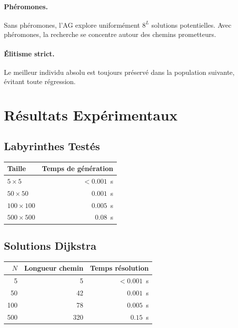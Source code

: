\documentclass[12pt, a4paper]{article}
\theoremstyle{definition}
\theoremstyle{remark}
\begin{document}
\paragraph{Phéromones.}
Sans phéromones, l'AG explore uniformément $8^L$ solutions potentielles.
Avec phéromones, la recherche se concentre autour des chemins prometteurs.

\paragraph{Élitisme strict.}
Le meilleur individu absolu est toujours préservé dans la population suivante,
évitant toute régression.

\section{Résultats Expérimentaux}

\subsection{Labyrinthes Testés}

\begin{center}
\begin{tabular}{lr}
    \toprule
    Taille & Temps de génération \\
    \midrule
    $5 \times 5$     & $< 0.001$~s \\
    $50 \times 50$   & $0.001$~s   \\
    $100 \times 100$ & $0.005$~s   \\
    $500 \times 500$ & $0.08$~s    \\
    \bottomrule
\end{tabular}
\end{center}

\subsection{Solutions Dijkstra}

\begin{center}
\begin{tabular}{rrr}
    \toprule
    $N$ & Longueur chemin & Temps résolution \\
    \midrule
    5   & 5   & $< 0.001$~s \\
    50  & 42  & $0.001$~s   \\
    100 & 78  & $0.005$~s   \\
    500 & 320 & $0.15$~s    \\
    \bottomrule
\end{tabular}
\end{center}
\end{document}
